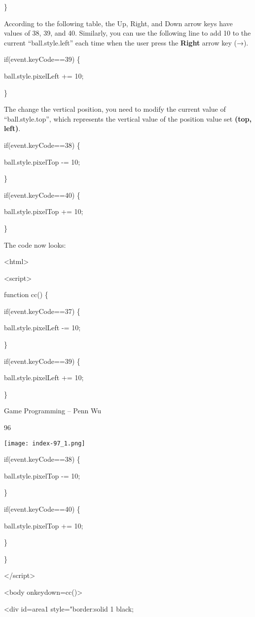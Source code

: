 \documentclass[
]{article}
\begin{document}
\}

According to the following table, the Up, Right, and Down arrow keys
have values of 38, 39, and 40. Similarly, you can use the following line
to add 10 to the current ``ball.style.left'' each time when the user
press the \textbf{Right} arrow key (→).

if(event.keyCode==39) \{

ball.style.pixelLeft += 10;

\}

The change the vertical position, you need to modify the current value
of ``ball.style.top'', which represents the vertical value of the
position value set \textbf{(top, left)}.

if(event.keyCode==38) \{

ball.style.pixelTop -= 10;

\}

if(event.keyCode==40) \{

ball.style.pixelTop += 10;

\}

The code now looks:

\textless html\textgreater{}

\textless script\textgreater{}

function cc() \{

if(event.keyCode==37) \{

ball.style.pixelLeft -= 10;

\}

if(event.keyCode==39) \{

ball.style.pixelLeft += 10;

\}

Game Programming -- Penn Wu

96

\protect\hypertarget{index_split_007.htmlux5cux23p97}{}{}\texttt{[image: index-97\_1.png]}

if(event.keyCode==38) \{

ball.style.pixelTop -= 10;

\}

if(event.keyCode==40) \{

ball.style.pixelTop += 10;

\}

\}

\textless/script\textgreater{}

\textless body onkeydown=cc()\textgreater{}

\textless div id=area1 style="border:solid 1 black;
\end{document}
